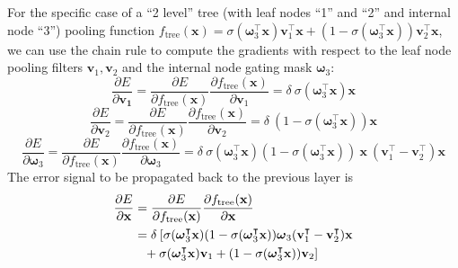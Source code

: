 \documentclass[twoside]{article}
\begin{document}
For the specific case of a ``2 level'' tree (with leaf nodes ``1'' and ``2'' and internal node ``3'')  
pooling function $f_\text{tree}(\mathbf{\mathbf{x}}) = \sigma(\boldsymbol{\omega}_{3}^\intercal \mathbf{x} ) \mathbf{v}_{1}^\intercal \mathbf{x} + (1-\sigma(\boldsymbol{\omega}_{3}^\intercal \mathbf{x} )) \mathbf{v}^\intercal_{2} \mathbf{x} $, 
we can use the chain rule to compute the gradients 
with respect to the leaf node pooling filters $\mathbf{v}_{1},\mathbf{v}_{2}$ and 
the internal node gating mask $\boldsymbol{\omega}_{3}$:
{
\tiny
\begin{equation}
      \frac{\partial E}{\partial \mathbf{v}_\mathbf{1}}
    = \frac{\partial E}{\partial f_\text{tree}(\mathbf{x})} 
         \frac{\partial f_\text{tree}(\mathbf{x})}{\partial \mathbf{v}_1} 
      = \delta \: \sigma (\boldsymbol{\omega}_{3}^\intercal \mathbf{x}) \mathbf{x}
\end{equation}    
\begin{equation}
      \frac{\partial E}{\partial \mathbf{v}_2}
    = \frac{\partial E}{\partial f_\text{tree}(\mathbf{x})} 
         \frac{\partial f_\text{tree}(\mathbf{x})}{\partial \mathbf{v}_2} 
      = \delta \: (1-\sigma (\boldsymbol{\omega}_{3}^\intercal \mathbf{x})) \mathbf{x}
\end{equation} 
\begin{equation}
      \frac{\partial E}{\partial \boldsymbol{\omega}_{3}}
    = \frac{\partial E}{\partial f_\text{tree}(\mathbf{x})} 
         \frac{\partial f_\text{tree}(\mathbf{x})}{\partial \boldsymbol{\omega}_{3}} 
      = \delta \: \sigma (\boldsymbol{\omega}_{3}^\intercal \mathbf{x})(1-\sigma (\boldsymbol{\omega}_{3}^\intercal \mathbf{x})) \: \mathbf{x} \: (\mathbf{v}^\intercal_{1}  - 
        \mathbf{v}^\intercal_{2}  ) \mathbf{x}
\end{equation} 
}%
The error signal to be propagated back to the previous layer is
{\scriptsize
\begin{align}
      \frac{\partial E}{\partial \mathbf{x}}
    &= \frac{\partial E}{\partial f_\text{tree}(\mathbf{x})} 
         \frac{\partial f_\text{tree}(\mathbf{x})}{\partial \mathbf{x}} \\
      &= \delta \: [ \sigma (\boldsymbol{\omega}_{3}^\intercal \mathbf{x}) (1-\sigma (\boldsymbol{\omega}_{3}^\intercal \mathbf{x})) \boldsymbol{\omega}_{3} ( \mathbf{v}^\intercal_1 - \mathbf{v}^\intercal_2 ) \mathbf{x} \\
      &\hspace{2.7mm}  +  \sigma (\boldsymbol{\omega}_{3}^\intercal \mathbf{x})\mathbf{v}_1 + (1-\sigma (\boldsymbol{\omega}_{3}^\intercal \mathbf{x})) \mathbf{v}_2  ] \nonumber
\end{align} 
}%
\end{document}

